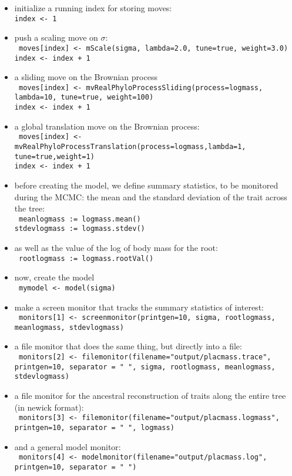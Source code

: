 \documentclass[usletter]{article}
\newcommand{\cmd}[1]{\texttt{#1}}
\begin{document}
\begin{itemize}
\item
initialize a running index for storing moves:
\\
\cmd{index <- 1}
\item
push a scaling move on $\sigma$:
\\
\cmd{
moves[index] <- mScale(sigma, lambda=2.0, tune=true, weight=3.0)
\\
index <- index + 1
}
\item
a sliding move on the Brownian process
\\
\cmd{
moves[index] <- mvRealPhyloProcessSliding(process=logmass, lambda=10, tune=true, weight=100)
\\
index <- index + 1
}
\item
a global translation move on the Brownian process:
\\
\cmd{
moves[index] <- mvRealPhyloProcessTranslation(process=logmass,lambda=1,
\\
tune=true,weight=1)
\\
index <- index + 1
}
\item
before creating the model, we define summary statistics, to be monitored during the MCMC: the mean and the standard deviation of the trait across the tree:
\\
\cmd{
meanlogmass := logmass.mean()
\\
stdevlogmass := logmass.stdev()
}
\item
as well as the value of the log of body mass for the root:
\\
\cmd{
rootlogmass := logmass.rootVal()
}
\item
now, create the model
\\
\cmd{
mymodel <- model(sigma)
}
\item
make a screen monitor that tracks the summary statistics of interest:
\\
\cmd{
monitors[1] <- screenmonitor(printgen=10, sigma, rootlogmass, meanlogmass, stdevlogmass)
}
\item
a file monitor that does the same thing, but directly into a file:
\\
\cmd{
monitors[2] <- filemonitor(filename="output/placmass.trace", printgen=10, separator = "       ", sigma, rootlogmass, meanlogmass, stdevlogmass)
}
\item
a file monitor for the ancestral reconstruction of traits along the entire tree (in newick format):
\\
\cmd{
monitors[3] <- filemonitor(filename="output/placmass.logmass", printgen=10, separator = "       ", logmass)
}
\item
and a general model monitor:
\\
\cmd{
monitors[4] <- modelmonitor(filename="output/placmass.log", printgen=10, separator = " ")
}
\end{itemize}
\end{document}
